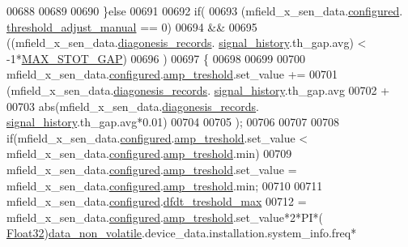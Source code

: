 \begin{DoxyCode}
00688 
00689 
00690                 \}\textcolor{keywordflow}{else}
00691 
00692                 \textcolor{keywordflow}{if}(
00693                   (mfield\_x\_sen\_data.\hyperlink{a00025_a94b2d1f6ea4ab334c74d24984dd27843}{configured}.
      \hyperlink{a00021_a18e270a10094f045f20299b0f7e83085}{threshold\_adjust\_manual} == 0)
00694                     &&
00695                   ((mfield\_x\_sen\_data.\hyperlink{a00025_a2bd79ce84bbd6b7f50d38954f7ae475e}{diagonesis\_records}.
      \hyperlink{a00019_ab7038f4de1f77b52a7f89e9f77c0b846}{signal\_history}.th\_gap.avg) < -1*\hyperlink{a00017_aec8939cfd4ea8a0119ec02a358811b17}{MAX\_STOT\_GAP})
00696                   )
00697                   \{
00698 
00699 
00700                       mfield\_x\_sen\_data.\hyperlink{a00025_a94b2d1f6ea4ab334c74d24984dd27843}{configured}.\hyperlink{a00021_a4b3bbfb0267daea1432f2603825ade62}{amp\_treshold}.set\_value  +=
00701                          (mfield\_x\_sen\_data.\hyperlink{a00025_a2bd79ce84bbd6b7f50d38954f7ae475e}{diagonesis\_records}.
      \hyperlink{a00019_ab7038f4de1f77b52a7f89e9f77c0b846}{signal\_history}.th\_gap.avg
00702                           +
00703                          abs(mfield\_x\_sen\_data.\hyperlink{a00025_a2bd79ce84bbd6b7f50d38954f7ae475e}{diagonesis\_records}.
      \hyperlink{a00019_ab7038f4de1f77b52a7f89e9f77c0b846}{signal\_history}.th\_gap.avg*0.01)
00704 
00705                          );
00706 
00707 
00708                      \textcolor{keywordflow}{if}(mfield\_x\_sen\_data.\hyperlink{a00025_a94b2d1f6ea4ab334c74d24984dd27843}{configured}.\hyperlink{a00021_a4b3bbfb0267daea1432f2603825ade62}{amp\_treshold}.set\_value < 
      mfield\_x\_sen\_data.\hyperlink{a00025_a94b2d1f6ea4ab334c74d24984dd27843}{configured}.\hyperlink{a00021_a4b3bbfb0267daea1432f2603825ade62}{amp\_treshold}.min)
00709                         mfield\_x\_sen\_data.\hyperlink{a00025_a94b2d1f6ea4ab334c74d24984dd27843}{configured}.\hyperlink{a00021_a4b3bbfb0267daea1432f2603825ade62}{amp\_treshold}.set\_value = 
      mfield\_x\_sen\_data.\hyperlink{a00025_a94b2d1f6ea4ab334c74d24984dd27843}{configured}.\hyperlink{a00021_a4b3bbfb0267daea1432f2603825ade62}{amp\_treshold}.min;
00710 
00711                       mfield\_x\_sen\_data.\hyperlink{a00025_a94b2d1f6ea4ab334c74d24984dd27843}{configured}.\hyperlink{a00021_adf9a37828e447378b1d533185213316d}{dfdt\_treshold\_max}
00712                         = mfield\_x\_sen\_data.\hyperlink{a00025_a94b2d1f6ea4ab334c74d24984dd27843}{configured}.\hyperlink{a00021_a4b3bbfb0267daea1432f2603825ade62}{amp\_treshold}.set\_value*2*PI*(
      \hyperlink{a00072_a87d38f886e617ced2698fc55afa07637}{Float32})\hyperlink{a00060_a76ac5f917f5308dcd83de0d7c94559fb}{data\_non\_volatile}.device\_data.installation.system\_info.freq*

\end{DoxyCode}
